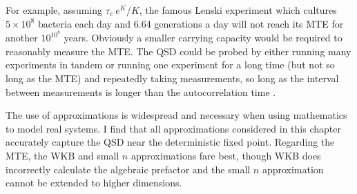 For example, assuming $\tau_e ~ e^K/K$, the famous Lenski experiment \cite{Lenski1991} which cultures $5\times 10^8$ bacteria each day and 6.64 generations a day will not reach its MTE for another $10^{10^8}$ years. Obviously a smaller carrying capacity would be required to reasonably measure the MTE. 
The QSD could be probed by either running many experiments in tandem or running one experiment for a long time (but not so long as the MTE) and repeatedly taking measurements, so long as the interval between measurements is longer than the autocorrelation time \cite{Hanggi1990}. %

The use of approximations is widespread and necessary when using mathematics to model real systems. 
I find that all approximations considered in this chapter accurately capture the QSD near the deterministic fixed point. %
Regarding the MTE, the WKB and small $n$ approximations fare best, though WKB does incorrectly calculate the algebraic prefactor \cite{Assaf2010,Badali2019a,Badali2019b} and the small $n$ approximation cannot be extended to higher dimensions. %

